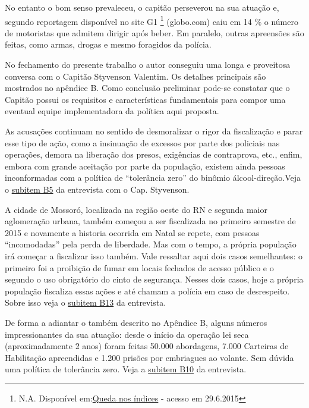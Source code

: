 \documentclass[
	12pt,				%
	openright,			%
	twoside,			%
	a4paper,			%
	chapter=TITLE,		%
	section=TITLE,		%
	subsection=TITLE,	%
	subsubsection=TITLE,%
	spanish,            %
	english,			%
	brazil				%
	]{abntex2}
\begin{document}
\par
No entanto o bom senso prevaleceu, o capitão perseverou na sua atuação e, segundo reportagem disponível no site G1 \footnote{N.A. Disponível em:\href{http://g1.globo.com/rn/rio-grande-do-norte/noticia/2015/06/cai-14-numero-de-natalenses-que-admitem-beber-e-dirigir-diz-ministerio.html}{Queda nos índices} - acesso em 29.6.2015} (globo.com) caiu em 14 \% o número de motoristas que admitem dirigir após beber. Em paralelo, outras apreensões são feitas, como armas, drogas e mesmo foragidos da polícia.
\par
No fechamento do presente trabalho o autor conseguiu uma longa e proveitosa conversa com o Capitão Styvenson Valentim. Os detalhes principais são mostrados no apêndice B. Como conclusão preliminar pode-se constatar que o Capitão possui os requisitos e características fundamentais para compor uma eventual equipe implementadora da política aqui proposta.
\hypertarget{Sty1}{} 
\par
As acusações continuam no sentido de desmoralizar o rigor da fiscalização e parar esse tipo de ação, como a insinuação de excessos por parte dos policiais nas
operações, demora na liberação dos presos, exigências de contraprova, etc., enfim, embora com grande aceitação por parte da população, existem ainda pessoas inconformadas com a política de “tolerância zero” do binômio álcool-direção.Veja o \hyperlink{B5}{subitem B5} da entrevista com o Cap. Styvenson.
\hypertarget{Sty}{}
\par
A cidade de Mossoró, localizada na região oeste do RN e segunda maior aglomeração urbana,  também começou a ser fiscalizada no primeiro semestre de 2015 e novamente a historia  ocorrida em Natal se
repete, com pessoas “incomodadas” pela perda de liberdade. Mas com o tempo, a própria população irá começar a fiscalizar isso também.
Vale ressaltar aqui dois casos semelhantes: o primeiro foi a proibição de fumar em locais fechados de acesso público e o segundo o uso obrigatório do cinto de segurança. Nesses dois casos, hoje a própria população fiscaliza essas ações e até chamam a polícia em caso
de desrespeito. Sobre isso veja o \hyperlink{B13}{subitem B13} da entrevista.
\hypertarget{Nat}{}
\par
De forma a adiantar o também descrito no Apêndice B, alguns números impressionantes da sua atuação: desde o início da operação lei seca (aproximadamente 2 anos) foram feitas 50.000 abordagens, 7.000 Carteiras de Habilitação apreendidas e 1.200 prisões por embriagues ao volante. Sem dúvida uma política de tolerância zero. Veja a \hyperlink{B10}{subitem B10} da entrevista. 
\end{document}
